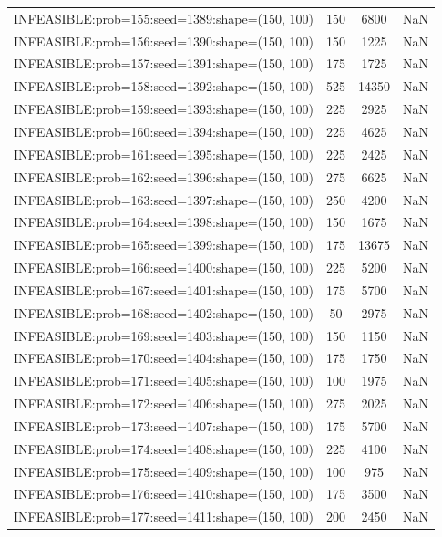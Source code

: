 \begin{longtable}{lccc}
INFEASIBLE:prob=155:seed=1389:shape=(150, 100) &      150 &  6800 &    NaN \\
INFEASIBLE:prob=156:seed=1390:shape=(150, 100) &      150 &  1225 &    NaN \\
INFEASIBLE:prob=157:seed=1391:shape=(150, 100) &      175 &  1725 &    NaN \\
INFEASIBLE:prob=158:seed=1392:shape=(150, 100) &      525 & 14350 &    NaN \\
INFEASIBLE:prob=159:seed=1393:shape=(150, 100) &      225 &  2925 &    NaN \\
INFEASIBLE:prob=160:seed=1394:shape=(150, 100) &      225 &  4625 &    NaN \\
INFEASIBLE:prob=161:seed=1395:shape=(150, 100) &      225 &  2425 &    NaN \\
INFEASIBLE:prob=162:seed=1396:shape=(150, 100) &      275 &  6625 &    NaN \\
INFEASIBLE:prob=163:seed=1397:shape=(150, 100) &      250 &  4200 &    NaN \\
INFEASIBLE:prob=164:seed=1398:shape=(150, 100) &      150 &  1675 &    NaN \\
INFEASIBLE:prob=165:seed=1399:shape=(150, 100) &      175 & 13675 &    NaN \\
INFEASIBLE:prob=166:seed=1400:shape=(150, 100) &      225 &  5200 &    NaN \\
INFEASIBLE:prob=167:seed=1401:shape=(150, 100) &      175 &  5700 &    NaN \\
INFEASIBLE:prob=168:seed=1402:shape=(150, 100) &       50 &  2975 &    NaN \\
INFEASIBLE:prob=169:seed=1403:shape=(150, 100) &      150 &  1150 &    NaN \\
INFEASIBLE:prob=170:seed=1404:shape=(150, 100) &      175 &  1750 &    NaN \\
INFEASIBLE:prob=171:seed=1405:shape=(150, 100) &      100 &  1975 &    NaN \\
INFEASIBLE:prob=172:seed=1406:shape=(150, 100) &      275 &  2025 &    NaN \\
INFEASIBLE:prob=173:seed=1407:shape=(150, 100) &      175 &  5700 &    NaN \\
INFEASIBLE:prob=174:seed=1408:shape=(150, 100) &      225 &  4100 &    NaN \\
INFEASIBLE:prob=175:seed=1409:shape=(150, 100) &      100 &   975 &    NaN \\
INFEASIBLE:prob=176:seed=1410:shape=(150, 100) &      175 &  3500 &    NaN \\
INFEASIBLE:prob=177:seed=1411:shape=(150, 100) &      200 &  2450 &    NaN \\

\end{longtable}
